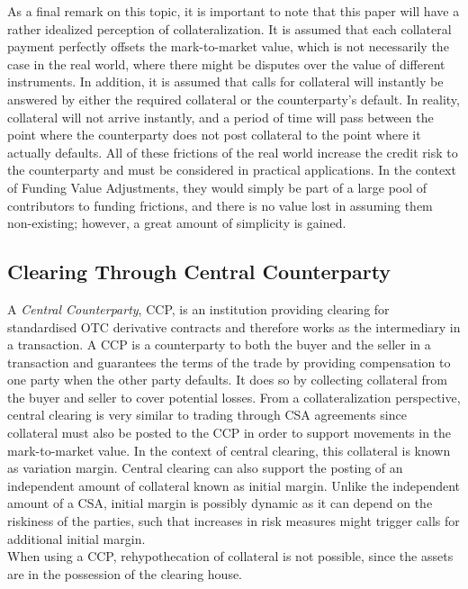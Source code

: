 \documentclass[main.tex]{subfiles}
\begin{document}
        As a final remark on this topic,
        it is important to note that this paper will have a rather idealized perception of collateralization.
        It is assumed that each collateral payment perfectly offsets the mark-to-market value,
        which is not necessarily the case in the real world,
        where there might be disputes over the value of different instruments.
        In addition, it is assumed that calls for collateral will instantly be answered
        by either the required collateral or the counterparty's default. 
        In reality, collateral will not arrive instantly, and a period of time will pass between
        the point where the counterparty does not post collateral to the point where it actually defaults.
        All of these frictions of the real world increase the credit risk to the counterparty
        and must be considered in practical applications. 
        In the context of Funding Value Adjustments, 
        they would simply be part of a large pool of contributors to funding frictions,
        and there is no value lost in assuming them non-existing;
        however, a great amount of simplicity is gained.

    \subsection{Clearing Through Central Counterparty}
        A \textit{Central Counterparty}, CCP, is an institution
        providing clearing for standardised OTC derivative contracts
        and therefore works as the intermediary in a transaction.
        A CCP is a counterparty to both the buyer and the seller in a transaction 
        and guarantees the terms of the trade by providing compensation to one party when the other party defaults.
        It does so by collecting collateral from the buyer and seller to cover potential losses.
        From a collateralization perspective, central clearing is very similar to trading through CSA agreements
        since collateral must also be posted to the CCP in order to support movements in the mark-to-market value.
        In the context of central clearing, this collateral is known as variation margin.
        Central clearing can also support the posting of an independent amount of collateral 
        known as initial margin.
        Unlike the independent amount of a CSA, initial margin is possibly dynamic 
        as it can depend on the riskiness of the parties, 
        such that increases in risk measures might trigger calls for additional initial margin.
        \\
        When using a CCP, rehypothecation of collateral is not possible,
        since the assets are in the possession of the clearing house.
\end{document}
